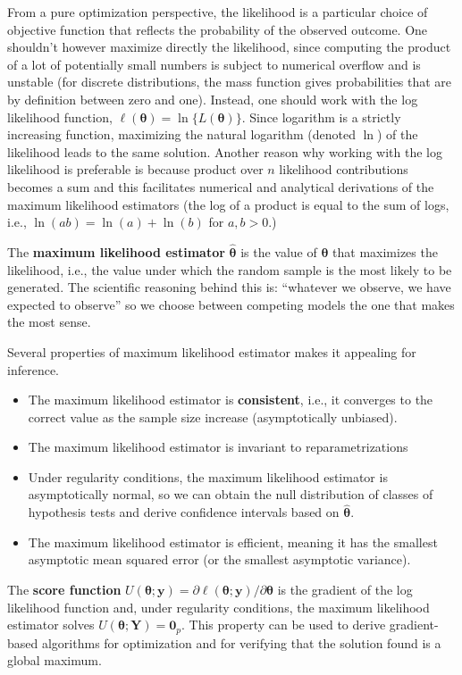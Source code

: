 \documentclass[
  11pt,
  letterpaper,
]{book}
\providecommand{\tightlist}{%
  \setlength{\itemsep}{0pt}\setlength{\parskip}{0pt}}
\theoremstyle{definition}
\theoremstyle{definition}
\theoremstyle{definition}
\theoremstyle{definition}
\theoremstyle{remark}
\begin{document}
From a pure optimization perspective, the likelihood is a particular choice of objective function that reflects the probability of the observed outcome. One shouldn't however maximize directly the likelihood, since computing the product of a lot of potentially small numbers is subject to numerical overflow and is unstable (for discrete distributions, the mass function gives probabilities that are by definition between zero and one). Instead, one should work with the log likelihood function, \(\ell(\boldsymbol{\theta}) = \ln\{L(\boldsymbol{\theta})\}\). Since logarithm is a strictly increasing function, maximizing the natural logarithm (denoted \(\ln\)) of the likelihood leads to the same solution. Another reason why working with the log likelihood is preferable is because product over \(n\) likelihood contributions becomes a sum and this facilitates numerical and analytical derivations of the maximum likelihood estimators (the log of a product is equal to the sum of logs, i.e., \(\ln(ab) =\ln(a) +\ln(b)\) for \(a, b>0\).)

The \textbf{maximum likelihood estimator} \(\widehat{\boldsymbol{\theta}}\) is the value of \(\boldsymbol{\theta}\) that maximizes the likelihood, i.e., the value under which the random sample is the most likely to be generated. The scientific reasoning behind this is: ``whatever we observe, we have expected to observe'' so we choose between competing models the one that makes the most sense.

Several properties of maximum likelihood estimator makes it appealing for inference.

\begin{itemize}
\tightlist
\item
  The maximum likelihood estimator is \textbf{consistent}, i.e., it converges to the correct value as the sample size increase (asymptotically unbiased).
\item
  The maximum likelihood estimator is invariant to reparametrizations
\item
  Under regularity conditions, the maximum likelihood estimator is asymptotically normal, so we can obtain the null distribution of classes of hypothesis tests and derive confidence intervals based on \(\widehat{\boldsymbol{\theta}}\).
\item
  The maximum likelihood estimator is efficient, meaning it has the smallest asymptotic mean squared error (or the smallest asymptotic variance).
\end{itemize}

The \textbf{score function} \(U(\boldsymbol{\theta}; \boldsymbol{y}) = \partial \ell(\boldsymbol{\theta}; \boldsymbol{y})/ \partial \boldsymbol{\theta}\) is the gradient of the log likelihood function and, under regularity conditions, the maximum likelihood estimator solves \(U(\boldsymbol{\theta}; \boldsymbol{Y})=\boldsymbol{0}_p\). This property can be used to derive gradient-based algorithms for optimization and for verifying that the solution found is a global maximum.
\end{document}
